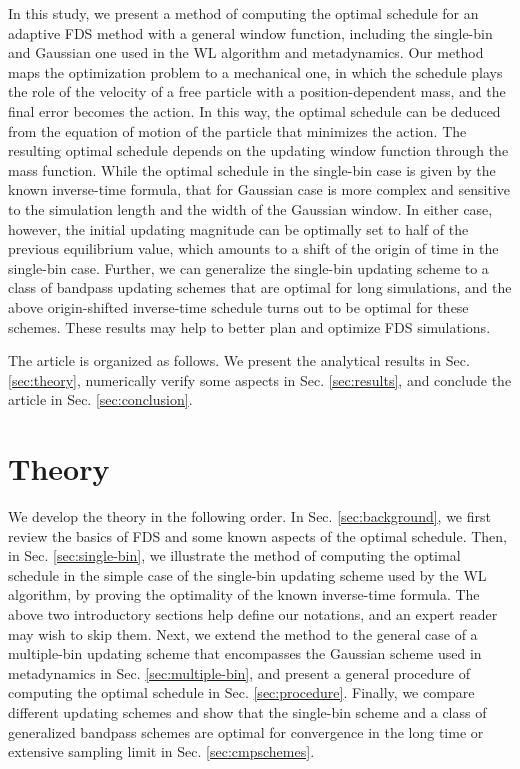 \documentclass[reprint, superscriptaddress, floatfix]{revtex4-1}
\begin{document}
In this study,
we present a method of computing
the optimal schedule
for an adaptive FDS method
with a general window function,
including the single-bin and Gaussian one
used in the WL algorithm and metadynamics.
%
Our method maps the optimization problem to a mechanical one,
in which the schedule plays the role of the velocity of
a free particle with a position-dependent mass,
and the final error becomes the action.
%
In this way, the optimal schedule
can be deduced from the equation of motion
of the particle that minimizes the action.
%
The resulting optimal schedule
depends on the updating window function
through the mass function.
%
While the optimal schedule in the single-bin case
is given by the known inverse-time formula,
that for Gaussian case is more complex
and sensitive to the simulation length
and the width of the Gaussian window.
%
In either case, however,
the initial updating magnitude
can be optimally set to
half of the previous equilibrium value,
which amounts to a shift of the origin of time
in the single-bin case.
%
Further, we can generalize
the single-bin updating scheme
to a class of bandpass updating schemes
that are optimal for long simulations,
and the above origin-shifted inverse-time schedule
turns out to be optimal for these schemes.
%
%
These results may help to better
plan and optimize FDS simulations.



The article is organized as follows.
%
We present the analytical results in Sec. \ref{sec:theory},
numerically verify some aspects
in Sec. \ref{sec:results},
and conclude the article
in Sec. \ref{sec:conclusion}.




\section{\label{sec:theory}
Theory}



We develop the theory
in the following order.
%
In Sec. \ref{sec:background},
we first review the basics of FDS
and some known aspects of the optimal schedule.
%
Then, in Sec. \ref{sec:single-bin},
we illustrate the method of
computing the optimal schedule
in the simple case of the
single-bin updating scheme
used by the WL algorithm,
by proving the optimality
of the known inverse-time formula.
%
The above two introductory sections help define our notations,
and an expert reader may wish to skip them.
%
Next, we extend the method to the general case
of a multiple-bin updating scheme
that encompasses the Gaussian scheme used in metadynamics
in Sec. \ref{sec:multiple-bin},
and present a general procedure of computing the optimal schedule
in Sec. \ref{sec:procedure}.
%
Finally, we compare different updating schemes
and show that the single-bin scheme
and a class of generalized bandpass schemes
are optimal for convergence
in the long time or extensive sampling limit
in Sec. \ref{sec:cmpschemes}.
\end{document}
